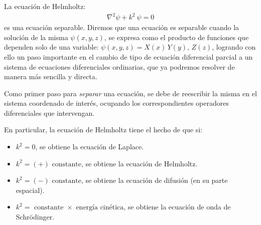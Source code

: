 La ecuación de Helmholtz:
\begin{align}
\nabla^{2} \psi + k^{2} \: \psi = 0
\label{eq:ecuacion_02_01}
\end{align}
es una ecuación separable. Diremos que una ecuación es separable cuando la solución de la misma $\psi(x, y, z)$, se expresa como el producto de funciones que dependen solo de una variable: $\psi(x, y, z) = X (x) \, Y (y),\, Z(z)$, logrando con ello un paso importante en el cambio de tipo de ecuación diferencial parcial a un sistema de ecuaciones diferenciales ordinarias, que ya podremos resolver de manera más sencilla y directa. 
\par
Como primer paso para \emph{separar} una ecuación, se debe de reescribir la misma en el sistema coordenado de interés, ocupando los correspondientes operadores diferenciales que intervengan.
\par
En particular, la ecuación de Helmholtz tiene el hecho de que si:
\begin{itemize}
\item $k^{2} = 0$, se obtiene la ecuación de Laplace.
\item $k^{2} = (+) \mbox{ constante}$, se obtiene la ecuación de Helmholtz.
\item $k^{2} = (-) \mbox{ constante}$, se obtiene la ecuación de difusión (en su parte espacial).
\item $k^{2} = \mbox{ constante } \times \mbox{ energía cinética}$, se obtiene la ecuación de onda de Schrödinger.
\end{itemize}

